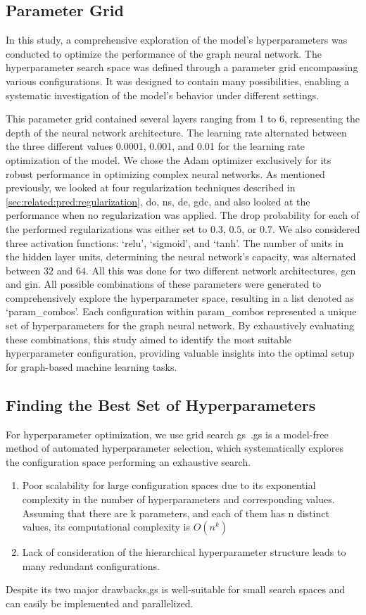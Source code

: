 \subsection{Parameter Grid}
In this study, a comprehensive exploration of the model's hyperparameters was conducted to optimize the performance of the graph neural network.
The hyperparameter search space was defined through a parameter grid encompassing various configurations.
It was designed to contain many possibilities, enabling a systematic investigation of the model's behavior under different settings.

This parameter grid contained several layers ranging from 1 to 6, representing the depth of the neural network architecture.
The learning rate alternated between the three different values 0.0001, 0.001, and 0.01 for the learning rate optimization of the model.
We chose the Adam optimizer exclusively for its robust performance in optimizing complex neural networks.
As mentioned previously, we looked at four regularization techniques described in \cref{sec:related:pred:regularization}, \ac{do}, \ac{ns}, \ac{de}, \ac{gdc}, and also looked at the performance when no regularization was applied.
The drop probability for each of the performed regularizations was either set to $0.3$, $0.5$, or $0.7$.
We also considered three activation functions: `relu', `sigmoid', and `tanh'.
The number of units in the hidden layer units, determining the neural network's capacity, was alternated between $32$ and $64$.
All this was done for two different network architectures, \ac{gcn} and \ac{gin}.
All possible combinations of these parameters were generated to comprehensively explore the hyperparameter space, resulting in a list denoted as `param_combos'.
Each configuration within param_combos represented a unique set of hyperparameters for the graph neural network. By exhaustively evaluating these combinations, this study aimed to identify the most suitable hyperparameter configuration, providing valuable insights into the optimal setup for graph-based machine learning tasks.

\subsection{Finding the Best Set of Hyperparameters}
\label{sec:implement:setup: gridsearch}
For hyperparameter optimization, we use grid search \ac{gs}~\cite{Lorenzo2017,Yang2020,Zoeller2021}.\Ac{gs} is a model-free method of automated hyperparameter selection, which systematically explores the configuration space performing an exhaustive search.
\begin{enumerate}
    \item Poor scalability for large configuration spaces due to its exponential complexity in the number of hyperparameters and corresponding values. Assuming that there are k parameters, and each of them has n distinct values, its computational complexity is $O(n^{k})$
    \item Lack of consideration of the hierarchical hyperparameter structure leads to many redundant configurations.
\end{enumerate}
Despite its two major drawbacks,\ac{gs} is well-suitable for small search spaces and can easily be implemented and parallelized.

